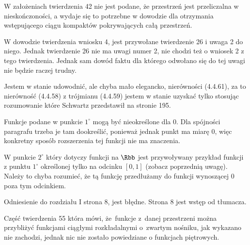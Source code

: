 \documentclass[a4paper,11pt]{article}
\numberwithin{equation}{section}
\begin{document}
\noindent
{} W założeniach twierdzenia 42 nie jest podane, że
przestrzeń jest przeliczalna w nieskończoności, a wydaje się to
potrzebne w dowodzie dla otrzymania wstępującego ciągu kompaktów
pokrywających całą przestrzeń.

\VerSpaceFour





\noindent
{} W dowodzie twierdzenia wniosku 4, jest przywołane
twierdzenie 26 i uwaga 2 do niego. Jednak twierdzenie 26 nie ma uwagi
numer 2, nie chodzi też o wniosek 2 z tego twierdzenia. Jednak sam
dowód faktu dla którego odwołano się do tej uwagi nie będzie raczej
trudny.

\VerSpaceFour





\noindent
{} Jestem w stanie udowodnić, ale chyba mało elegancko,
nierówności (4.4.61), za to nierówność (4.4.58) z trójmianu (4.4.59)
jestem w stanie uzyskać tylko stosując rozumowanie które Schwartz
przedstawił na stronie 195.

\VerSpaceFour





\noindent
{} Funkcje podane w punkcie $1^{ \circ }$ mogą być
nieokreślone dla 0. Dla spójności paragrafu trzeba je tam dookreślić,
ponieważ jednak punkt ma miarę 0, więc konkretny sposób rozszerzenia
tej funkcji nie ma znaczenia.

\VerSpaceFour



\noindent
{} W punkcie $2^{ \circ }$ który dotyczy funkcji na
$\Rbb$ jest przywoływany przykład funkcji z punktu $1^{ \circ }$
określonej tylko na odcinku $[ 0, 1 ]$ (zobacz poprzednią uwagę).
Należy to chyba rozumieć, że tą funkcję przedłużamy do funkcji
wynoszącej 0 poza tym odcinkiem.

\VerSpaceFour





\noindent
{} Odniesienie do rozdziału I strona 8, jest błędne.
Strona 8 jest wstęp od tłumacza.

\VerSpaceFour





\noindent
{} Część twierdzenia 55 która mówi, że~funkcje z~danej
przestrzeni można przybliżyć funkcjami ciągłymi rozkładalnymi
o~zwartym nośniku, jak wykazano nie zachodzi, jednak nic nie zostało
powiedziane o funkcjach piętrowych.
\end{document}
